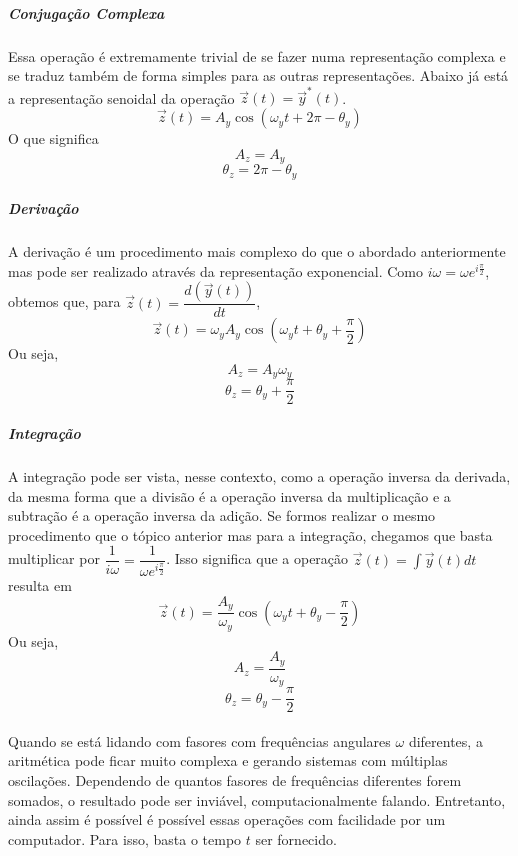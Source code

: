\documentclass[conference,harvard, brazil]{sbatex}
\begin{document}
	\subparagraph{Conjugação Complexa}Essa operação é extremamente trivial de se fazer numa representação complexa e se traduz também de forma simples para as outras representações. Abaixo já está a representação senoidal da operação $\overrightarrow{z}(t)=\overrightarrow{y}^{*}(t)$.
	\begin{equation*}
		\overrightarrow{z}(t) = A_y\cos(\omega_yt+2\pi-\theta_y)
	\end{equation*}
	O que significa
	\begin{equation*}
		A_z=A_y
	\end{equation*}
	\begin{equation}
		\theta_z=2\pi-\theta_y
		\label{eq:conj}
	\end{equation}
	
	\subparagraph{Derivação}A derivação é um procedimento mais complexo do que o abordado anteriormente mas pode ser realizado através da representação exponencial. Como $i\omega=\omega e^{i\tfrac{\pi}{2}}$, obtemos que, para $\overrightarrow{z}(t)=\dfrac{d(\overrightarrow{y}(t))}{dt}$,
	\begin{equation*}
		\overrightarrow{z}(t) = \omega_yA_y\cos\left(\omega_yt+\theta_y+\dfrac{\pi}{2}\right)
	\end{equation*}
	Ou seja,
	\begin{equation*}
		A_z=A_y\omega_y
	\end{equation*}
	\begin{equation}
		\theta_z=\theta_y+\dfrac{\pi}{2}
		\label{eq:der}
	\end{equation}
	
	\subparagraph{Integração}A integração pode ser vista, nesse contexto, como a operação inversa da derivada, da mesma forma que a divisão é a operação inversa da multiplicação e a subtração é a operação inversa da adição. Se formos realizar o mesmo procedimento que o tópico anterior mas para a integração, chegamos que basta multiplicar por $\dfrac{1}{i\omega}=\dfrac{1}{\omega e^{i\tfrac{\pi}{2}}}$. Isso significa que a operação $\overrightarrow{z}(t)=\int\overrightarrow{y}(t)dt$ resulta em
	\begin{equation*}
		\overrightarrow{z}(t) = \dfrac{A_y}{\omega_y}\cos\left(\omega_yt+\theta_y-\dfrac{\pi}{2}\right)
	\end{equation*}
	Ou seja,
	\begin{equation*}
		A_z=\dfrac{A_y}{\omega_y}
	\end{equation*}
	\begin{equation}
		\theta_z=\theta_y-\dfrac{\pi}{2}
		\label{eq:int}
	\end{equation}
	
	\paragraph{}Quando se está lidando com fasores com frequências angulares $\omega$ diferentes, a aritmética pode ficar muito complexa e gerando sistemas com múltiplas oscilações. Dependendo de quantos fasores de frequências diferentes forem somados, o resultado pode ser inviável, computacionalmente falando. Entretanto, ainda assim é possível é possível essas operações com facilidade por um computador. Para isso, basta o tempo $t$ ser fornecido.

%	
\end{document}
